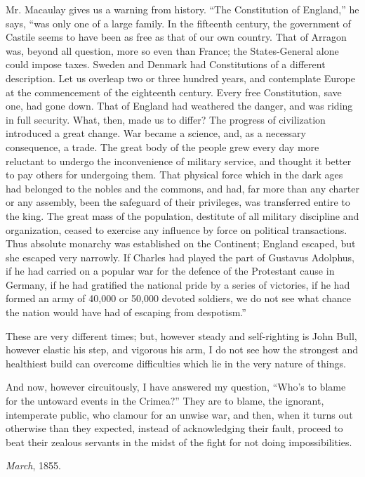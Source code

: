 Mr. Macaulay gives us a warning from history. ``The
Constitution of England,'' he says, ``was only one of a large family. In
the fifteenth century, the government of Castile seems to have been as
free as that of our own country. That of Arragon was, beyond all
question, more so even than France; the States-General alone could
impose taxes. Sweden and Denmark had Constitutions of a different
description. Let us overleap two or three hundred years, and
contemplate Europe at the commencement of the eighteenth century.
Every free Constitution, save one, had gone down. That of England had
weathered the danger, and was riding in full security. What, then,
made us to differ? The progress of civilization introduced a great
change. War became a science, and, as a necessary consequence, a
trade. The great body of the people grew every day more reluctant to
undergo the inconvenience of military service, and thought it better
to pay others for undergoing them. That physical force which in the
dark ages had belonged to the nobles and the commons, and had, far
more than any charter or any assembly, been the safeguard of their
privileges, was transferred entire to the king. The great mass of the
population, destitute of all military discipline and organization,
ceased to exercise any influence by force on political transactions.
Thus absolute monarchy was established on the Continent; England
escaped, but she escaped very narrowly. If Charles had played the part
of Gustavus Adolphus, if he had carried on a popular war for the
defence of the Protestant cause in Germany, if he had gratified the
national pride by a series of victories, if he had formed an army of
40,000 or 50,000 devoted soldiers, we do not see what chance the
nation would have had of escaping from despotism.''

These are very different times; but, however
steady and self-righting is John Bull, however elastic his step, and
vigorous his arm, I do not see how the strongest and healthiest build
can overcome difficulties which lie in the very nature of things.

And now, however circuitously, I have answered my
question, ``Who's to blame for the untoward events in the Crimea?'' They
are to blame, the ignorant, intemperate public, who clamour for an
unwise war, and then, when it turns out otherwise than they expected,
instead of acknowledging their fault, proceed to beat their zealous
servants in the midst of the fight for not doing impossibilities.

\emph{March}, 1855.


